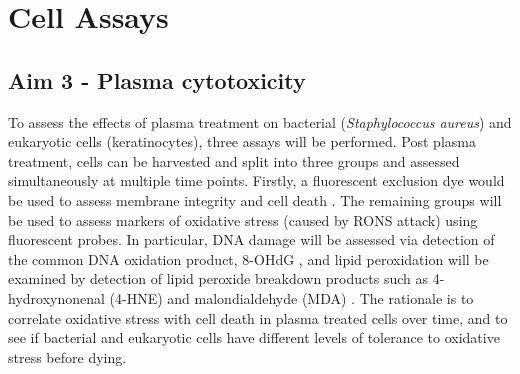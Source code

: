 \documentclass[11pt, oneside]{article}   	%
\begin{document}
\section*{Cell Assays}

\subsection*{Aim 3 - Plasma cytotoxicity}
To assess the effects of plasma treatment on bacterial (\textit{Staphylococcus aureus}) and eukaryotic cells (keratinocytes), three assays will be performed.
Post plasma treatment, cells can be harvested and split into three groups and assessed simultaneously at multiple time points.
Firstly, a fluorescent exclusion dye would be used to assess membrane integrity and cell death \cite{Kepp2011cell}.
The remaining groups will be used to assess markers of oxidative stress (caused by RONS attack) using fluorescent probes. 
In particular, DNA damage will be assessed via detection of the common DNA oxidation product, 8-OHdG \cite{Valavanidis20098, Dizdaroglu2012oxidatively}, and lipid peroxidation will be examined by detection of lipid peroxide breakdown products such as 4-hydroxynonenal (4-HNE) and malondialdehyde (MDA) \cite{Ayala2014lipid, Joshi2010control, Joshi2011nonthermal}.
The rationale is to correlate oxidative stress with cell death in plasma treated cells over time, and to see if bacterial and eukaryotic cells have different levels of tolerance to oxidative stress before dying.




\end{document}
